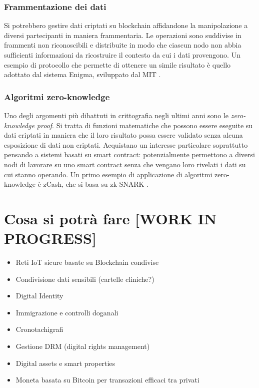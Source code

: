         \subsubsection{Frammentazione dei dati}
            Si potrebbero gestire dati criptati su blockchain affidandone la manipolazione a diversi partecipanti in maniera frammentaria. Le operazioni sono suddivise in frammenti non riconoscibili e distribuite in modo che ciascun nodo non abbia sufficienti informazioni da ricostruire il contesto da cui i dati provengono. Un esempio di protocollo che permette di ottenere un simile risultato è quello adottato dal sistema Enigma, sviluppato dal MIT \cite{enigma}.
        \subsubsection{Algoritmi zero-knowledge}
            Uno degli argomenti più dibattuti in crittografia negli ultimi anni sono le \emph{zero-knowledge proof}. Si tratta di funzioni matematiche che possono essere eseguite su dati criptati in maniera che il loro risultato possa essere validato senza alcuna esposizione di dati non criptati. Acquistano un interesse particolare soprattutto pensando a sistemi basati su smart contract: potenzialmente permettono a diversi nodi di lavorare su uno smart contract senza che vengano loro rivelati i dati su cui stanno operando. Un primo esempio di applicazione di algoritmi zero-knowledge è zCash, che si basa su zk-SNARK \cite{zkSNARK}.

\section{Cosa si potrà fare [WORK IN PROGRESS]}
    \begin{itemize}
        \item Reti IoT sicure basate su Blockchain condivise
        \item Condivisione dati sensibili (cartelle cliniche?)
        \item Digital Identity
        \item Immigrazione e controlli doganali
        \item Cronotachigrafi
        \item Gestione DRM (digital rights management)
        \item Digital assets e smart properties
        \item Moneta basata su Bitcoin per transazioni efficaci tra privati
\end{itemize}
